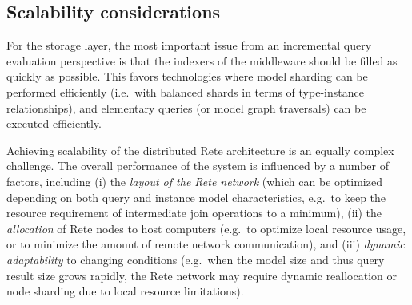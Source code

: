 


\subsection{Scalability considerations}
For the storage layer, the most important issue from an incremental query evaluation perspective is that the indexers of the middleware should be filled as quickly as possible. This favors technologies where model sharding can be performed efficiently (i.e.\ with balanced shards in terms of type-instance relationships), and elementary queries (or model graph traversals) can be executed efficiently.

Achieving scalability of the distributed Rete architecture is an equally complex challenge. The overall performance of the system is influenced by a number of factors, including (i) the \emph{layout of the Rete network} (which can be optimized depending on both query and instance model characteristics, e.g.\ to keep the resource requirement of intermediate join operations to a minimum), (ii) the \emph{allocation} of Rete nodes to host computers (e.g.\ to optimize local resource usage, or to minimize the amount of remote network communication), and (iii) \emph{dynamic adaptability} to changing conditions (e.g.\ when the model size and thus query result size grows rapidly, the Rete network may require dynamic reallocation or node sharding due to local resource limitations).
